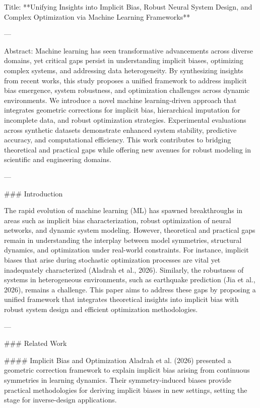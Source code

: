 Title: **Unifying Insights into Implicit Bias, Robust Neural System Design, and Complex Optimization via Machine Learning Frameworks**

---

Abstract:  
Machine learning has seen transformative advancements across diverse domains, yet critical gaps persist in understanding implicit biases, optimizing complex systems, and addressing data heterogeneity. By synthesizing insights from recent works, this study proposes a unified framework to address implicit bias emergence, system robustness, and optimization challenges across dynamic environments. We introduce a novel machine learning-driven approach that integrates geometric corrections for implicit bias, hierarchical imputation for incomplete data, and robust optimization strategies. Experimental evaluations across synthetic datasets demonstrate enhanced system stability, predictive accuracy, and computational efficiency. This work contributes to bridging theoretical and practical gaps while offering new avenues for robust modeling in scientific and engineering domains.

---

### Introduction

The rapid evolution of machine learning (ML) has spawned breakthroughs in areas such as implicit bias characterization, robust optimization of neural networks, and dynamic system modeling. However, theoretical and practical gaps remain in understanding the interplay between model symmetries, structural dynamics, and optimization under real-world constraints. For instance, implicit biases that arise during stochastic optimization processes are vital yet inadequately characterized (Aladrah et al., 2026). Similarly, the robustness of systems in heterogeneous environments, such as earthquake prediction (Jia et al., 2026), remains a challenge. This paper aims to address these gaps by proposing a unified framework that integrates theoretical insights into implicit bias with robust system design and efficient optimization methodologies.

---

### Related Work

#### Implicit Bias and Optimization  
Aladrah et al. (2026) presented a geometric correction framework to explain implicit bias arising from continuous symmetries in learning dynamics. Their symmetry-induced biases provide practical methodologies for deriving implicit biases in new settings, setting the stage for inverse-design applications.


